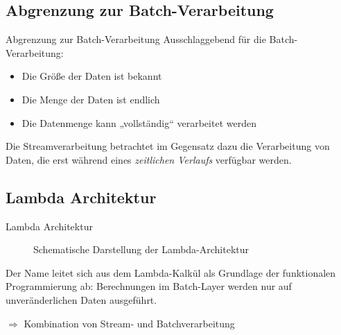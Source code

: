\documentclass{beamer}
\begin{document}
\subsection{Abgrenzung zur Batch-Verarbeitung}

\begin{frame}[t]{Abgrenzung zur Batch-Verarbeitung}
  Ausschlaggebend für die Batch-Verarbeitung:
  \begin{itemize}
    \item Die Größe der Daten ist bekannt
    \item Die Menge der Daten ist endlich
    \item Die Datenmenge kann „vollständig“ verarbeitet werden
  \end{itemize}
  Die Streamverarbeitung betrachtet im Gegensatz dazu die Verarbeitung
  von Daten, die erst während eines \textit{zeitlichen Verlaufs} verfügbar
  werden.

\end{frame}


\subsection{Lambda Architektur}
\begin{frame}[t]{Lambda Architektur}
  \begin{figure}[h]
    \center
    \scalebox{.3}{}
    \caption{Schematische Darstellung der Lambda-Architektur}
    \label{fig:lambdaarch}
  \end{figure}
  Der Name leitet sich aus dem Lambda-Kalkül als Grundlage der
  funktionalen Programmierung ab: Berechnungen im Batch-Layer werden
  nur auf unveränderlichen Daten ausgeführt.

  $\Rightarrow$ Kombination von Stream- und Batchverarbeitung
\end{frame}
\end{document}

